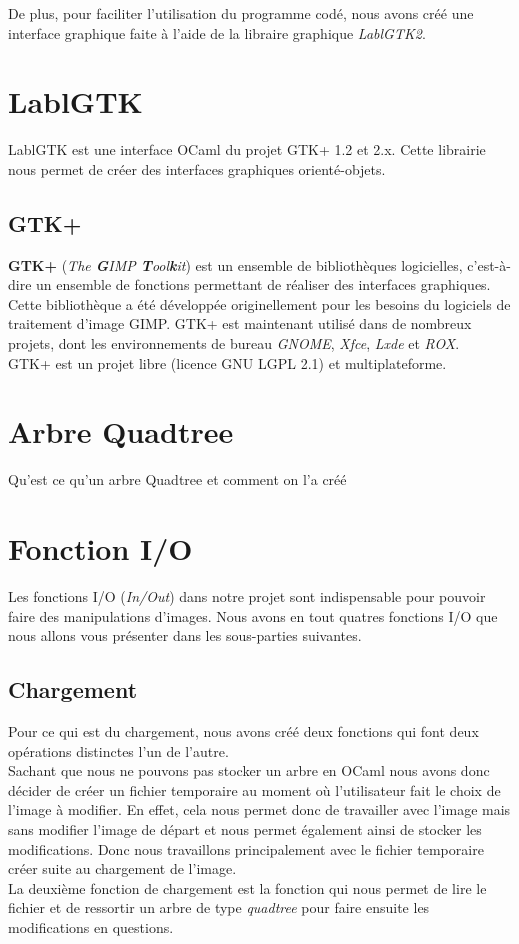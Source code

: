 \documentclass[12pt]{article}
\begin{document}
De plus, pour faciliter l'utilisation du programme codé, nous avons créé une interface graphique faite à l'aide de la libraire graphique \textit{LablGTK2}.
\section{LablGTK}
LablGTK est une interface OCaml du projet GTK+ 1.2 et 2.x. Cette librairie nous permet de créer des interfaces graphiques orienté-objets.
\subsection{GTK+}
\textbf{GTK+} (\textit{The \textbf{G}IMP \textbf{T}ool\textbf{k}it}) est un ensemble de bibliothèques logicielles, c'est-à-dire un ensemble de fonctions permettant de réaliser des interfaces graphiques. Cette bibliothèque a été développée originellement pour les besoins du logiciels de traitement d'image GIMP. GTK+ est maintenant utilisé dans de nombreux projets, dont les environnements de bureau \textit{GNOME}, \textit{Xfce}, \textit{Lxde} et \textit{ROX}. \\
GTK+ est un projet libre (licence GNU LGPL 2.1) et multiplateforme.
\section{Arbre Quadtree}
Qu'est ce qu'un arbre Quadtree et comment on l'a créé
\section{Fonction I/O}
Les fonctions I/O (\textit{In/Out}) dans notre projet sont indispensable pour pouvoir faire des manipulations d'images. Nous avons en tout quatres fonctions I/O que nous allons vous présenter dans les sous-parties suivantes. 
\subsection{Chargement}
Pour ce qui est du chargement, nous avons créé deux fonctions qui font deux opérations distinctes l'un de l'autre. \\
Sachant que nous ne pouvons pas stocker un arbre en OCaml nous avons donc décider de créer un fichier temporaire au moment où l'utilisateur fait le choix de l'image à modifier. En effet, cela nous permet donc de travailler avec l'image mais sans modifier l'image de départ et nous permet également ainsi de stocker les modifications. Donc nous travaillons principalement avec le fichier temporaire créer suite au chargement de l'image. \\
La deuxième fonction de chargement est la fonction qui nous permet de lire le fichier et de ressortir un arbre de type \textit{quadtree} pour faire ensuite les modifications en questions.
\end{document}
